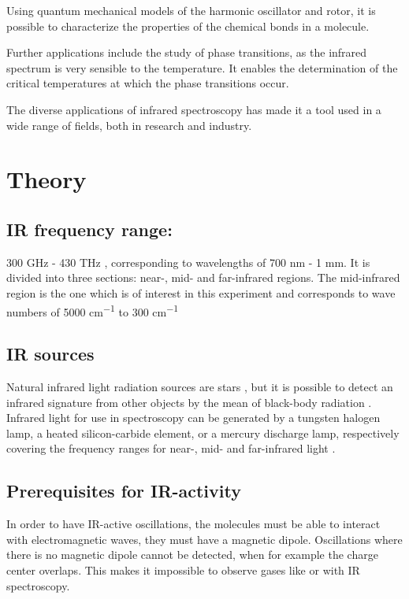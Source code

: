 \documentclass[12pt]{article}
\begin{document}
Using quantum mechanical models of the harmonic oscillator and rotor, it is possible to characterize the properties of the chemical bonds in a molecule.

Further applications include the study of phase transitions, as the infrared spectrum is very sensible to the temperature. It enables the determination of the critical temperatures at which the phase transitions occur.

The diverse applications of infrared spectroscopy has made it a tool used in a wide range of fields, both in research and industry.

\section{Theory}

\subsection{IR frequency range:} 300 GHz - 430 THz \cite{InfraredWikipedia}, corresponding to wavelengths of 700 nm - 1 mm. It is divided into three sections: near-, mid- and far-infrared regions. The mid-infrared region is the one which is of interest in this experiment and corresponds to wave numbers of 5000 \si{cm^{-1}} to 300 \si{cm^{-1}} 

\subsection{IR sources} 
Natural infrared light radiation sources are stars \cite{NASAInfrared}, but it is possible to detect an infrared signature from other objects by the mean of black-body radiation \cite{BlackBodyRadiationWikipedia}.
Infrared light for use in spectroscopy can be generated by a tungsten halogen lamp, a heated silicon-carbide element, or a mercury discharge lamp, respectively covering the frequency ranges for near-, mid- and far-infrared light \cite{FourierTransformInfraRedSpectroscopy}. 

\subsection{Prerequisites for IR-activity}
In order to have IR-active oscillations, the molecules must be able to interact with electromagnetic waves, they must have a magnetic dipole. Oscillations where there is no magnetic dipole cannot be detected, when for example the charge center overlaps. This makes it impossible to observe gases like  or  with IR spectroscopy.
\end{document}
